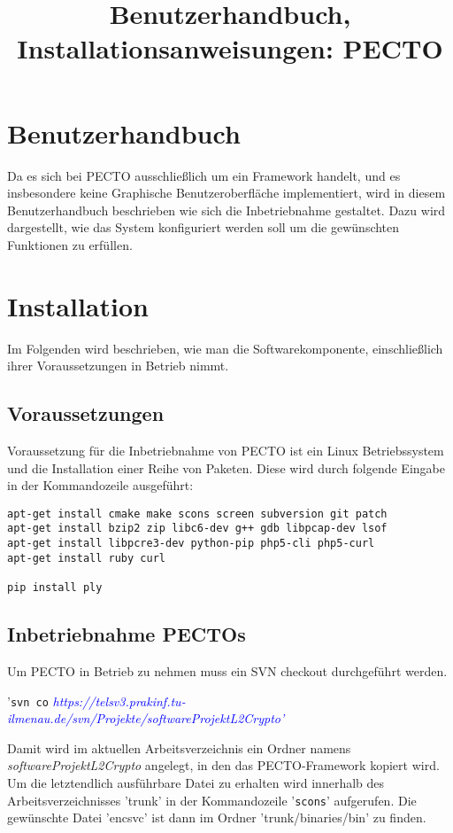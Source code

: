 \documentclass[a4paper, 11pt, ngerman, fleqn]{article}
\begin{document}
\title{Benutzerhandbuch, Installationsanweisungen: PECTO}
\vspace{3 in}
\maketitle
\clearpage

\section*{Benutzerhandbuch}
Da es sich bei PECTO ausschließlich um ein Framework handelt, und es insbesondere keine Graphische Benutzeroberfläche implementiert, wird in diesem Benutzerhandbuch beschrieben wie sich die Inbetriebnahme gestaltet.
Dazu wird dargestellt, wie das System konfiguriert werden soll um die gewünschten Funktionen zu erfüllen.

\section{Installation}
Im Folgenden wird beschrieben, wie man die Softwarekomponente, einschließlich ihrer Voraussetzungen in Betrieb nimmt.
\subsection{Voraussetzungen}
Voraussetzung für die Inbetriebnahme von PECTO ist ein Linux Betriebssystem und die Installation einer Reihe von Paketen.
Diese wird durch folgende Eingabe in der Kommandozeile ausgeführt:
\begin{lstlisting}
apt-get install cmake make scons screen subversion git patch
apt-get install bzip2 zip libc6-dev g++ gdb libpcap-dev lsof 
apt-get install libpcre3-dev python-pip php5-cli php5-curl 
apt-get install ruby curl

pip install ply
\end{lstlisting}

\subsection{Inbetriebnahme PECTOs}
Um PECTO in Betrieb zu nehmen muss ein SVN checkout durchgeführt werden.\newline
\parbox{\textwidth}{'\texttt{svn co} \textit{\textcolor{blue}{https://telsv3.prakinf.tu-ilmenau.de/svn/Projekte/softwareProjektL2Crypto'}}}

Damit wird im aktuellen Arbeitsverzeichnis ein Ordner namens \textit{softwareProjektL2Crypto} angelegt, in den das PECTO-Framework kopiert wird.
Um die letztendlich ausführbare Datei zu erhalten wird innerhalb des Arbeitsverzeichnisses 'trunk' in der Kommandozeile '\texttt{scons}' aufgerufen. Die gewünschte Datei 'encsvc' ist dann im Ordner 'trunk/binaries/bin' zu finden.
\end{document}
